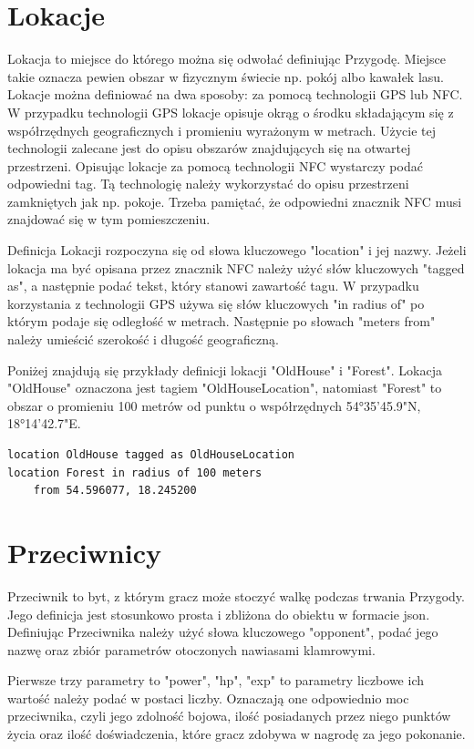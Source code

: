 \documentclass	{xmgr}
\begin{document}
\section{Lokacje}
Lokacja to miejsce do którego można się odwołać definiując Przygodę. Miejsce takie oznacza pewien obszar w fizycznym świecie np. pokój albo kawałek lasu. Lokacje można definiować na dwa sposoby: za pomocą technologii GPS lub NFC. 
W przypadku technologii GPS lokacje opisuje okrąg o środku składającym się z współrzędnych geograficznych i promieniu wyrażonym w metrach. Użycie tej technologii zalecane jest do opisu obszarów znajdujących się na otwartej przestrzeni.
Opisując lokacje za pomocą technologii NFC wystarczy podać odpowiedni tag. Tą technologię należy wykorzystać do opisu przestrzeni zamkniętych jak np. pokoje. Trzeba pamiętać, że odpowiedni znacznik NFC musi znajdować się w tym pomieszczeniu.

Definicja Lokacji rozpoczyna się od słowa kluczowego "location" i jej nazwy. Jeżeli lokacja ma być opisana przez znacznik NFC należy użyć słów kluczowych "tagged as", a następnie podać tekst, który stanowi zawartość tagu. W przypadku korzystania z technologii GPS używa się słów kluczowych "in radius of" po którym podaje się odległość w metrach. Następnie po słowach "meters from" należy umieścić szerokość i długość geograficzną.

Poniżej znajdują się przykłady definicji lokacji "OldHouse" i "Forest". Lokacja "OldHouse" oznaczona jest tagiem "OldHouseLocation", natomiast "Forest" to obszar o promieniu 100 metrów od punktu o współrzędnych 54°35'45.9"N, 18°14'42.7"E.
\begin{lstlisting}
location OldHouse tagged as OldHouseLocation
location Forest in radius of 100 meters 
	from 54.596077, 18.245200
\end{lstlisting}

\section{Przeciwnicy}

Przeciwnik to byt, z którym gracz może stoczyć walkę podczas trwania Przygody. Jego definicja jest stosunkowo prosta i zbliżona do obiektu w formacie json. Definiując Przeciwnika należy użyć słowa kluczowego "opponent", podać jego nazwę oraz zbiór parametrów otoczonych nawiasami klamrowymi.

Pierwsze trzy parametry to "power", "hp", "exp" to parametry liczbowe ich wartość należy podać w postaci liczby. Oznaczają one odpowiednio moc przeciwnika, czyli jego zdolność bojowa, ilość posiadanych przez niego punktów życia oraz ilość doświadczenia, które gracz zdobywa w nagrodę za jego pokonanie.
\end{document}
